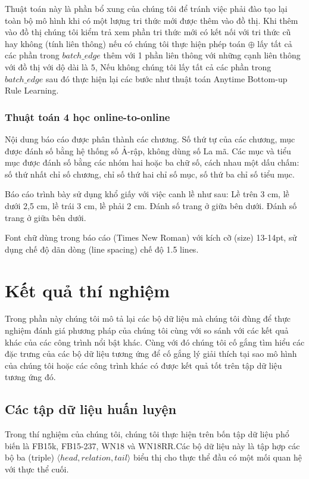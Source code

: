 Thuật toán này là phần bổ xung của chúng tôi để tránh việc phải đào tạo lại toàn bộ mô hình khi có một lượng tri thức mới được thêm vào đồ thị. Khi thêm vào đồ thị chúng tôi kiểm trả xem phần tri thức mới có kết nối với tri thức cũ hay không (tính liên thông) nếu có chúng tôi thực hiện phép toán \(\oplus\) lấy  tất cả các phần trong \(batch\_edge\) thêm với 1 phần liên thông với những cạnh liên thông với đồ thị với dộ dài là \(5\), Nếu không chúng tôi lấy tất cả các phần trong \(batch\_edge\) sau đó thực hiện lại các bước như thuật toán Anytime Bottom-up Rule Learning.

\subsubsection{Thuật toán 4 học online-to-online}
Nội dung báo cáo được phân thành các chương. Số thứ tự của các chương, mục được đánh số bằng hệ thống số Ả-rập, không dùng số La mã. Các mục và tiểu mục được đánh số bằng các nhóm hai hoặc ba chữ số, cách nhau một dấu chấm: số thứ nhất chỉ số chương, chỉ số thứ hai chỉ số mục, số thứ ba chỉ số tiểu mục.


 Báo cáo trình bày sử dụng khổ giấy với việc canh lề như sau: Lề trên 3 cm, lề dưới 2,5 cm, lề trái 3 cm, lề phải 2 cm. Đánh số trang ở giữa bên dưới. Đánh số trang ở giữa bên dưới.

Font chữ dùng trong báo cáo (Times New Roman) với kích cỡ (size) 13-14pt, sử dụng chế độ dãn dòng (line spacing) chế độ 1.5 lines.


\section{Kết quả thí nghiệm}
Trong phần này chúng tôi mô tả lại các bộ dữ liệu mà chúng tôi đùng để thực nghiệm đánh giá phương pháp của chúng tôi cùng với so sánh với các kết quả khác của các công trình nổi bật khác. Cùng với đó chúng tôi cố gắng tìm hiểu các đặc trưng của các bộ dữ liệu tương ứng để cố gắng lý giải thích tại sao mô hình của chúng tôi hoặc các công trình khác có được kết quả tốt trên tập dữ liệu tương ứng đó.
\subsection{Các tập dữ liệu huấn luyện}
Trong thí nghiệm của chúng tôi, chúng tôi thực hiện trên bốn tập dữ liệu phổ biến là FB15k, FB15-237, WN18 và WN18RR.Các bộ dữ liệu này là tập hợp các bộ ba (triple) \(\langle head, relation, tail \rangle\) biểu thị cho thực thể đầu có một mối quan hệ với thực thể cuối.

